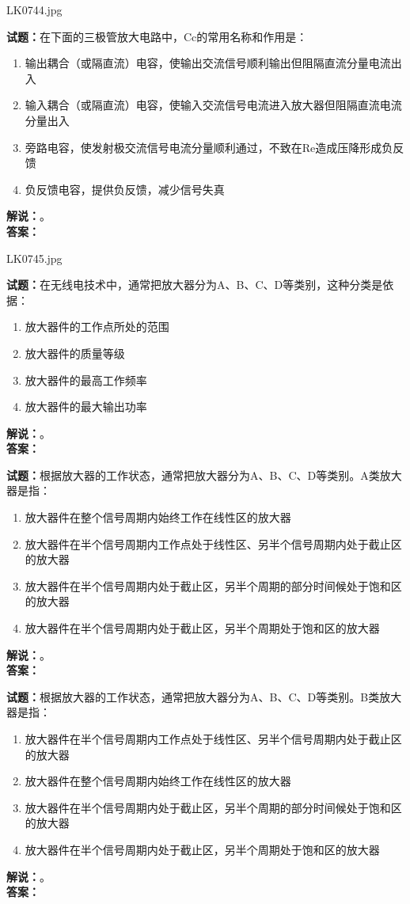 \documentclass{ctexbook}
\begin{document}
LK0744.jpg

\noindent\textbf{试题：}在下面的三极管放大电路中，Cc的常用名称和作用是：
\begin{enumerate}[leftmargin=3em]
  \item 输出耦合（或隔直流）电容，使输出交流信号顺利输出但阻隔直流分量电流出入
  \item 输入耦合（或隔直流）电容，使输入交流信号电流进入放大器但阻隔直流电流分量出入
  \item 旁路电容，使发射极交流信号电流分量顺利通过，不致在Re造成压降形成负反馈
  \item 负反馈电容，提供负反馈，减少信号失真
\end{enumerate}
\noindent\textbf{解说：}\textbf{}。\\\noindent\textbf{答案：}

\bigskip

LK0745.jpg

\noindent\textbf{试题：}在无线电技术中，通常把放大器分为A、B、C、D等类别，这种分类是依据：
\begin{enumerate}[leftmargin=3em]
  \item 放大器件的工作点所处的范围
  \item 放大器件的质量等级
  \item 放大器件的最高工作频率
  \item 放大器件的最大输出功率
\end{enumerate}
\noindent\textbf{解说：}\textbf{}。\\\noindent\textbf{答案：}

\bigskip

\noindent\textbf{试题：}根据放大器的工作状态，通常把放大器分为A、B、C、D等类别。A类放大器是指：
\begin{enumerate}[leftmargin=3em]
  \item 放大器件在整个信号周期内始终工作在线性区的放大器
  \item 放大器件在半个信号周期内工作点处于线性区、另半个信号周期内处于截止区的放大器
  \item 放大器件在半个信号周期内处于截止区，另半个周期的部分时间候处于饱和区的放大器
  \item 放大器件在半个信号周期内处于截止区，另半个周期处于饱和区的放大器
\end{enumerate}
\noindent\textbf{解说：}\textbf{}。\\\noindent\textbf{答案：}

\bigskip

\noindent\textbf{试题：}根据放大器的工作状态，通常把放大器分为A、B、C、D等类别。B类放大器是指：
\begin{enumerate}[leftmargin=3em]
  \item 放大器件在半个信号周期内工作点处于线性区、另半个信号周期内处于截止区的放大器
  \item 放大器件在整个信号周期内始终工作在线性区的放大器
  \item 放大器件在半个信号周期内处于截止区，另半个周期的部分时间候处于饱和区的放大器
  \item 放大器件在半个信号周期内处于截止区，另半个周期处于饱和区的放大器
\end{enumerate}
\noindent\textbf{解说：}\textbf{}。\\\noindent\textbf{答案：}
\end{document}
